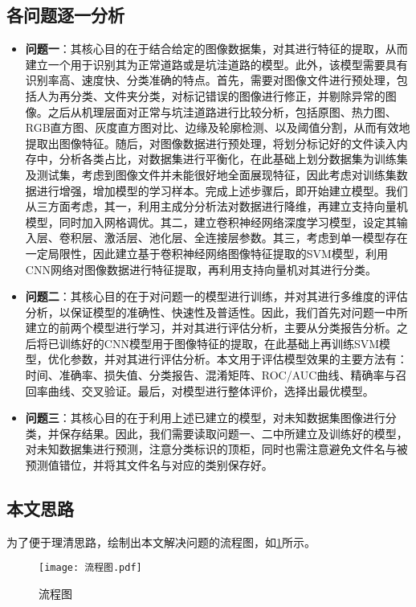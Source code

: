 \documentclass{MathorCupmodeling}
\begin{document}
	\subsection{各问题逐一分析}
	\begin{itemize}
		\item \textbf{问题一}：其核心目的在于{\heiti 结合给定的图像数据集，对其进行特征的提取，从而建立一个用于识别其为正常道路或是坑洼道路的模型}。此外，该模型需要具有{\heiti 识别率高、速度快、分类准确}的特点。首先，需要对图像文件进行预处理，包括人为再分类、文件夹分类，对标记错误的图像进行修正，并剔除异常的图像。之后从机理层面对正常与坑洼道路进行比较分析，包括原图、热力图、RGB直方图、灰度直方图对比、边缘及轮廓检测、以及阈值分割，从而有效地提取出图像特征。随后，对图像数据进行预处理，将划分标记好的文件读入内存中，分析各类占比，对数据集进行平衡化，在此基础上划分数据集为训练集及测试集，考虑到图像文件并未能很好地全面展现特征，因此考虑对训练集数据进行增强，增加模型的学习样本。完成上述步骤后，即开始建立模型。我们从三方面考虑，其一，利用主成分分析法对数据进行降维，再建立支持向量机模型，同时加入网格调优。其二，建立卷积神经网络深度学习模型，设定其输入层、卷积层、激活层、池化层、全连接层参数。其三，考虑到单一模型存在一定局限性，因此建立基于卷积神经网络图像特征提取的SVM模型，利用CNN网络对图像数据进行特征提取，再利用支持向量机对其进行分类。
		\item \textbf{问题二}：其核心目的在于{\heiti 对问题一的模型进行训练，并对其进行多维度的评估分析，以保证模型的准确性、快速性及普适性}。因此，我们首先对问题一中所建立的前两个模型进行学习，并对其进行评估分析，主要从分类报告分析。之后将已训练好的CNN模型用于图像特征的提取，在此基础上再训练SVM模型，优化参数，并对其进行评估分析。本文用于评估模型效果的主要方法有：时间、准确率、损失值、分类报告、混淆矩阵、ROC/AUC曲线、精确率与召回率曲线、交叉验证。最后，对模型进行整体评价，选择出最优模型。
		\item \textbf{问题三}：其核心目的在于{\heiti 利用上述已建立的模型，对未知数据集图像进行分类，并保存结果}。因此，我们需要读取问题一、二中所建立及训练好的模型，对未知数据集进行预测，注意分类标识的顶柜，同时也需注意避免文件名与被预测值错位，并将其文件名与对应的类别保存好。
	\end{itemize}
	\subsection{本文思路}
	为了便于理清思路，绘制出本文解决问题的流程图，如\textcolor{blue}{\cref{fig:流程图}}所示。
	\begin{figure}[H]
		\centering
		\texttt{[image: 流程图.pdf]}
		\caption{流程图}
		\label{fig:流程图}
	\end{figure}
\end{document}
